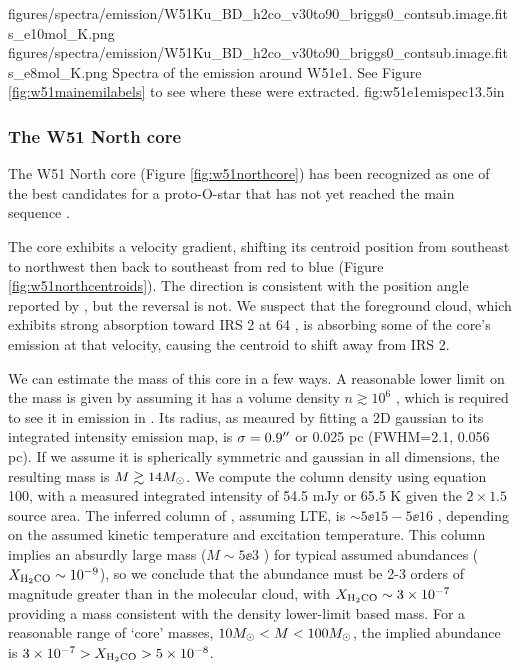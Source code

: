 \FigureTwoAA
{figures/spectra/emission/W51Ku_BD_h2co_v30to90_briggs0_contsub.image.fits_e10mol_K.png}
{figures/spectra/emission/W51Ku_BD_h2co_v30to90_briggs0_contsub.image.fits_e8mol_K.png}
{Spectra of the \twotwo emission around W51e1.  See Figure
\ref{fig:w51mainemilabels} to see where these were extracted.
}
{fig:w51e1emispec}{1}{3.5in}


\subsubsection{The W51 North core}
\label{sec:northcore}
The W51 North core (Figure \ref{fig:w51northcore}) has been recognized as one
of the best candidates for a proto-O-star that has not yet reached the main
sequence \citep{Zapata2009a,Zapata2010a,Goddi2015a}.  

The core exhibits a velocity gradient, shifting its centroid position from
southeast to northwest then back to southeast from red to blue (Figure
\ref{fig:w51northcentroids}).  The direction is consistent
with the position angle reported by \citet{Zapata2010a}, but the reversal is
not.  We suspect that the foreground cloud, which exhibits strong absorption
toward IRS 2 at 64 \kms, is absorbing some of the core's emission at that
velocity, causing the centroid to shift away from IRS 2.

We can estimate the mass of this core in a few ways.  A reasonable lower limit
on the mass is given by assuming it has a volume density $n\gtrsim10^6$ \percc,
which is required to see it in emission in \ortho \twotwo.  Its radius, as
meaured by fitting a 2D gaussian to its integrated intensity emission map, is
$\sigma=0.9\mbox{$^{\prime\prime}$}$ or 0.025 pc (FWHM=2.1\arcsec, 0.056 pc).  If we assume it
is spherically symmetric and gaussian in
all dimensions, the resulting mass is $M\gtrsim14M_{\odot}$.
We compute the \ortho \twotwo column density using \citet{Mangum2015a} equation
100, with a measured integrated intensity of 54.5 mJy \kms or 65.5 K \kms given
the $2\times1.5$\arcsec source area.  The inferred column of \ortho,
assuming LTE, is $\sim5\ee{15} - 5\ee{16}$ \persc, depending on the assumed
kinetic temperature and excitation temperature.  This \formaldehyde column
implies an absurdly large mass ($M\sim5\ee{3}$ \msun) for typical assumed abundances
($X_{\textrm{H}_2\textrm{CO}}\sim10^{-9}$), so we conclude that the \formaldehyde abundance
must be 2-3 orders of magnitude greater than in the molecular cloud, with
$X_{\textrm{H}_2\textrm{CO}}\sim3\times10^{-7}$ providing a mass consistent with the density
lower-limit based mass.  For a reasonable range of `core' masses, $10
M_{\odot}<M<100 M_{\odot}$, the implied abundance is $3\times10^{-7} > X_{\textrm{H}_2\textrm{CO}} >
5\times10^{-8}$.

